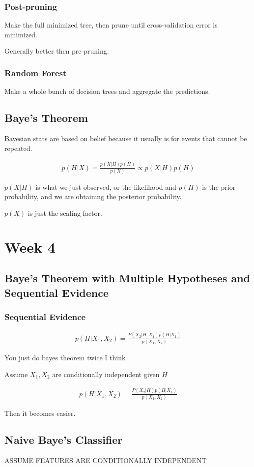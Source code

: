 \documentclass[fleqn]{report}
\newcommand{\equations} [1] {
\begin{gather*}
#1
\end{gather*}
}
\begin{document}
\subsection{Post-pruning}
Make the full minimized tree, then prune until cross-validation 
error is minimized.

Generally better then pre-pruning.

\subsection{Random Forest}
Make a whole bunch of decision trees and aggregate the predictions.

\section{Baye's Theorem}
Bayesian stats are based on belief because it usually is for events that 
cannot be repeated. 

\equations{
    p(H|X)
    =
    \frac{p(X|H) p(H)}{p(X)}
    \propto
    p(X|H) p(H)
}

$p(X|H)$ is what we just observed, or the likelihood 
and $p(H)$ is the prior probability, and we are obtaining 
the posterior probability.

$p(X)$ is just the scaling factor. 

\chapter{Week 4}

\section{Baye's Theorem with Multiple Hypotheses and Sequential Evidence}
\subsection{Sequential Evidence}
\equations{ 
    p(H|X_1, X_2) 
    =
    \frac{P(X_2 | H, X_1) p(H|X_1)}{p(X_1, X_2)}
}
You just do bayes theorem twice I think

Assume $X_1, X_2$ are conditionally independent given $H$ 
\equations{ 
    p(H|X_1, X_2) 
    =
    \frac{P(X_2 | H) p(H|X_1)}{p(X_1, X_2)}
}

Then it becomes easier.


\section{Naive Baye's Classifier}
ASSUME FEATURES ARE CONDITIONALLY INDEPENDENT
\end{document}
